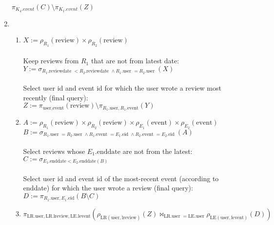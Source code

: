 \documentclass{article}
\newcommand{\GETS}{:=}
\newcommand{\rename}{\rho}
\newcommand{\select}{\sigma}
\newcommand{\rel}[1]{\text{#1}}
\newcommand{\attr}[1]{\text{#1}}
\newcommand{\ra}[2]{\rel{#1}.\attr{#2}}
\newcommand{\project}{\pi}
\newcommand{\product}{\times}
\newcommand{\difference}{\setminus}
\newcommand{\njoin}{\Join}
\begin{document}
\begin{enumerate}
        $\project_{K_4.event}(C) \difference \project_{K_1.event}(Z)$ \\
  \item
    \begin{enumerate}
      \item $X \GETS \rename_{R_1}(\rel{review}) \product
                      \rename_{R_2}(\rel{review})$ \\ \\
            Keep reviews from $R_1$ that are not from latest date: \\
            $Y \GETS \select_{R_1.\attr{reviewdate } < R_2.\attr{reviewdate }
                              \land R_1.\attr{user } = R_2.\attr{user }}(X)$ \\ \\
            Select user id and event id for which the user wrote a review most
            recently (final query): \\
            $Z \GETS
              \project_{\attr{user}, \attr{event}}(\rel{review}) \difference
              \project_{R_1.\attr{user}, R_1.\attr{event}}(Y)$ \\
      \item $A \GETS \rename_{R_1}(\rel{review}) \product
                      \rename_{R_2}(\rel{review}) \product
                      \rename_{E_1}(\rel{event}) \product
                      \rename_{E_2}(\rel{event})$ \\
            $B \GETS \select_{R_1.\attr{user } = R_2.\attr{user } \land
                              R_1.\attr{event } = E_1.\attr{eid } \land
                              R_2.\attr{event } = E_2.\attr{eid }}(A)$ \\ \\
            Select reviews whose $E_1.\attr{enddate}$ are not from the latest: \\
            $C \GETS \select_{E_1.\attr{enddate} < E_2.\attr{enddate}(B)}$ \\ \\
            Select user id and event id of the most-recent event (according to
            enddate) for which the user wrote a review (final query): \\
            $D \GETS \project_{R_1.\attr{user}, E_1.\attr{eid}}(B \difference C)$ \\
      \item $\project_{\ra{LR}{user}, \ra{LR}{lreview}, \ra{LE}{levent}}
              (\rename_{\rel{LR}(\rel{user}, \rel{lreview})}(Z)
                \njoin_{\ra{LR}{user } = \ra{LE}{user}}
                \rename_{\rel{LE}(\rel{user}, \rel{levent})}(D))$ \\
    \end{enumerate}


\end{enumerate}
\end{document}
